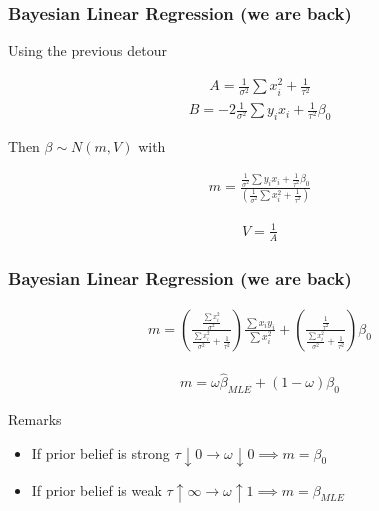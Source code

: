 \documentclass[
  shownotes,
  xcolor={svgnames},
  hyperref={colorlinks,citecolor=DarkBlue,linkcolor=DarkRed,urlcolor=DarkBlue}
  , aspectratio=169]{beamer}
\begin{document}
\begin{frame}[fragile]
\frametitle{Bayesian Linear Regression (we are back)}

Using the previous detour

\begin{align}
A= \frac{1}{\sigma^2}\sum x_i^2 +\frac{1}{\tau^2}
\end{align}
\medskip
\begin{align}
B= -2 \frac{1}{\sigma^2}\sum y_i x_i +\frac{1}{\tau^2} \beta_0
\end{align}

Then $\beta\sim N(m,V)$ with

\begin{align}
m=\frac{\frac{1}{\sigma^2}\sum y_i x_i +\frac{1}{\tau^2} \beta_0}{(\frac{1}{\sigma^2}\sum x_i^2 +\frac{1}{\tau^2})}
\end{align}

\begin{align}
 V=\frac{1}{A}
\end{align}


\end{frame}

\begin{frame}[fragile]
\frametitle{Bayesian Linear Regression (we are back)}

\begin{align}
m=\left(\frac{\frac{\sum x_i^2}{\sigma^2}}{\frac{\sum x_i^2}{\sigma^2}+\frac{1}{\tau^2}}\right)\frac{\sum x_iy_i}{\sum x_i^2} + \left(\frac{\frac{1}{\tau^2}}{\frac{\sum x_i^2}{\sigma^2}+\frac{1}{\tau^2}}\right)\beta_0
\end{align}

\medskip

\begin{align}
m = \omega \hat \beta_{MLE} + (1-\omega) \beta_0
\end{align}

Remarks 

\begin{itemize}
  \item If prior belief is strong $\tau \downarrow 0 \rightarrow \omega \downarrow 0 \implies m=\beta_0$ 
  \item If prior belief is weak $\tau \uparrow \infty \rightarrow \omega \uparrow 1 \implies m=\beta_{MLE}$ 

\end{itemize}

\end{frame}
\end{document}

